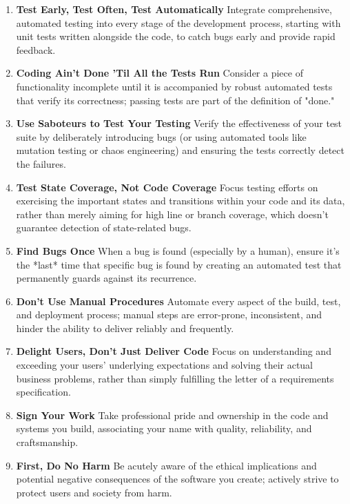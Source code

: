 \documentclass[11pt]{article}
\begin{document}
\begin{enumerate}[label=\arabic*., start=82, itemsep=1ex]
    \item \textbf{Test Early, Test Often, Test Automatically}
    Integrate comprehensive, automated testing into every stage of the development process, starting with unit tests written alongside the code, to catch bugs early and provide rapid feedback.

    \item \textbf{Coding Ain't Done 'Til All the Tests Run}
    Consider a piece of functionality incomplete until it is accompanied by robust automated tests that verify its correctness; passing tests are part of the definition of "done."

    \item \textbf{Use Saboteurs to Test Your Testing}
    Verify the effectiveness of your test suite by deliberately introducing bugs (or using automated tools like mutation testing or chaos engineering) and ensuring the tests correctly detect the failures.

    \item \textbf{Test State Coverage, Not Code Coverage}
    Focus testing efforts on exercising the important states and transitions within your code and its data, rather than merely aiming for high line or branch coverage, which doesn't guarantee detection of state-related bugs.

    \item \textbf{Find Bugs Once}
    When a bug is found (especially by a human), ensure it's the *last* time that specific bug is found by creating an automated test that permanently guards against its recurrence.

    \item \textbf{Don't Use Manual Procedures}
    Automate every aspect of the build, test, and deployment process; manual steps are error-prone, inconsistent, and hinder the ability to deliver reliably and frequently.

    \item \textbf{Delight Users, Don't Just Deliver Code}
    Focus on understanding and exceeding your users' underlying expectations and solving their actual business problems, rather than simply fulfilling the letter of a requirements specification.

    \item \textbf{Sign Your Work}
    Take professional pride and ownership in the code and systems you build, associating your name with quality, reliability, and craftsmanship.

    \item \textbf{First, Do No Harm}
    Be acutely aware of the ethical implications and potential negative consequences of the software you create; actively strive to protect users and society from harm.


\end{enumerate}
\end{document}
